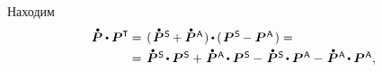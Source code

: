 \begin{otherlanguage}{russian}
\vspace{-1.32em} \noindent Находим
\vspace{.2em}\[\begin{array}{r@{\hspace{.25em}}c@{\hspace{.4em}}l}
\mathdotabove{\bm{P}} \dotp \bm{P}^{\T} & = & (\hspace{.1em} \mathdotabove{\bm{P}}^{\mathsf{\hspace{.12ex}S}} \hspace{-0.16ex} + \mathdotabove{\bm{P}}^{\mathsf{\hspace{.12ex}A}} \hspace{.05em}) \hspace{-0.1ex} \dotp \hspace{-0.1ex} (\hspace{.1em} \bm{P}^{\mathsf{\hspace{.12ex}S}} \hspace{-0.16ex} - \bm{P}^{\mathsf{\hspace{.12ex}A}} \hspace{.1ex} \hspace{.05em}) =
\\[0.25em]
& = & \mathdotabove{\bm{P}}^{\mathsf{\hspace{.12ex}S}} \hspace{-0.2ex}\dotp \bm{P}^{\mathsf{\hspace{.12ex}S}}
+ \hspace{.2ex} \mathdotabove{\bm{P}}^{\mathsf{\hspace{.12ex}A}} \hspace{-0.2ex}\dotp \bm{P}^{\mathsf{\hspace{.12ex}S}}
- \hspace{.2ex} \mathdotabove{\bm{P}}^{\mathsf{\hspace{.12ex}S}} \hspace{-0.2ex}\dotp \bm{P}^{\mathsf{\hspace{.12ex}A}}
- \hspace{.2ex} \mathdotabove{\bm{P}}^{\mathsf{\hspace{.12ex}A}} \hspace{-0.2ex}\dotp \bm{P}^{\mathsf{\hspace{.12ex}A}} ,
\end{array}\]


\end{otherlanguage}
